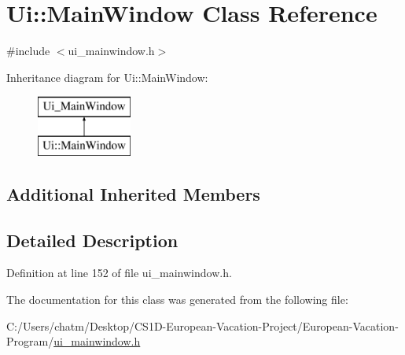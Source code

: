 \hypertarget{class_ui_1_1_main_window}{}\section{Ui\+::Main\+Window Class Reference}
\label{class_ui_1_1_main_window}


{\ttfamily \#include $<$ui\+\_\+mainwindow.\+h$>$}

Inheritance diagram for Ui\+::Main\+Window\+:\begin{figure}[H]
\begin{center}
\leavevmode
\includegraphics[height=2.000000cm]{class_ui_1_1_main_window}
\end{center}
\end{figure}
\subsection*{Additional Inherited Members}


\subsection{Detailed Description}


Definition at line 152 of file ui\+\_\+mainwindow.\+h.



The documentation for this class was generated from the following file\+:\begin{DoxyCompactItemize}
\item 
C\+:/\+Users/chatm/\+Desktop/\+C\+S1\+D-\/\+European-\/\+Vacation-\/\+Project/\+European-\/\+Vacation-\/\+Program/\mbox{\hyperlink{ui__mainwindow_8h}{ui\+\_\+mainwindow.\+h}}\end{DoxyCompactItemize}
